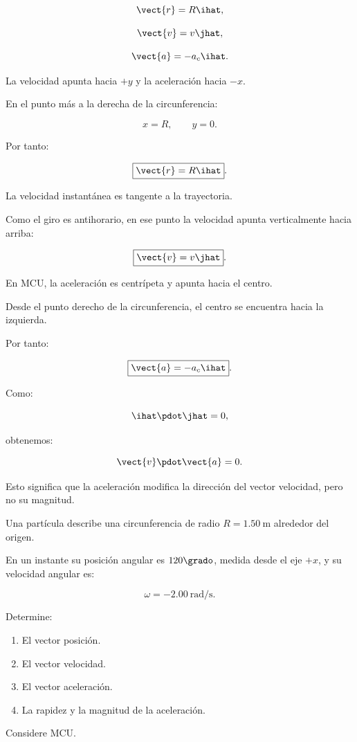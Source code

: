 \begin{respuesta}
\[
\vect{r}=R\ihat,
\]

\[
\vect{v}=v\jhat,
\]

\[
\vect{a}=-a_c\ihat.
\]

La velocidad apunta hacia \(+y\) y la aceleración hacia \(-x\).
\end{respuesta}

\begin{explicacion}
En el punto más a la derecha de la circunferencia:

\[
x=R,
\qquad
y=0.
\]

Por tanto:

\[
\boxed{\vect{r}=R\ihat}.
\]

La velocidad instantánea es tangente a la trayectoria.

Como el giro es antihorario, en ese punto la velocidad
apunta verticalmente hacia arriba:

\[
\boxed{\vect{v}=v\jhat}.
\]

En MCU, la aceleración es centrípeta y apunta hacia el centro.

Desde el punto derecho de la circunferencia, el centro
se encuentra hacia la izquierda.

Por tanto:

\[
\boxed{\vect{a}=-a_c\ihat}.
\]

Como:

\[
\ihat\pdot\jhat=0,
\]

obtenemos:

\[
\vect{v}\pdot\vect{a}=0.
\]

Esto significa que la aceleración modifica la dirección del
vector velocidad, pero no su magnitud.
\end{explicacion}


\nivelintermedio

\begin{ejercicio}
Una partícula describe una circunferencia de radio
\(R=\SI{1.50}{\meter}\) alrededor del origen.

En un instante su posición angular es \(120\grado\),
medida desde el eje \(+x\), y su velocidad angular es:

\[
\omega=-\SI{2.00}{\radian\per\second}.
\]

Determine:

\begin{enumerate}[label=\alph*)]
    \item El vector posición.
    \item El vector velocidad.
    \item El vector aceleración.
    \item La rapidez y la magnitud de la aceleración.
\end{enumerate}

Considere MCU.
\end{ejercicio}

